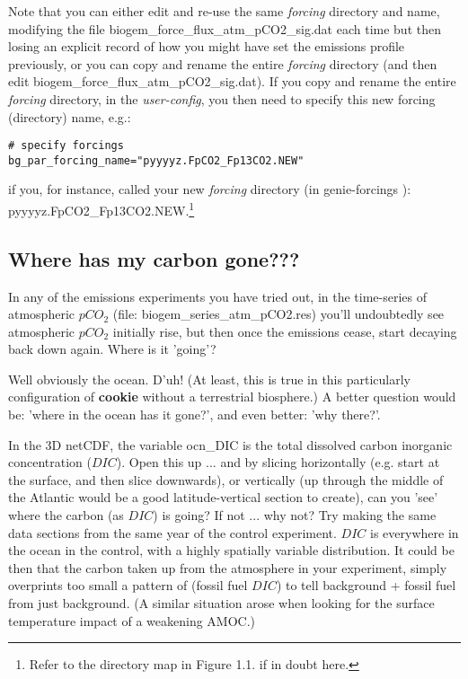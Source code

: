 Note that you can either edit and re-use the same \textit{forcing} directory and name, modifying the file \textsf{\footnotesize biogem\_force\_flux\_atm\_pCO2\_sig.dat} each time but then losing an explicit record of how you might have set the emissions profile previously, or you can copy and rename the entire \textit{forcing} directory (and then edit \textsf{\footnotesize biogem\_force\_flux\_atm\_pCO2\_sig.dat}). If you copy and rename the entire \textit{forcing} directory, in the \textit{user-config}, you then need to specify this new forcing (directory) name, e.g.:
\vspace{-2pt}\small\begin{verbatim}
# specify forcings
bg_par_forcing_name="pyyyyz.FpCO2_Fp13CO2.NEW"
\end{verbatim}\normalsize\vspace{-2pt}
if you, for instance, called your new \textit{forcing} directory (in \textsf{\footnotesize genie-forcings }): \textsf{\footnotesize pyyyyz.FpCO2\_Fp13CO2.NEW}.\footnote{Refer to the directory map in Figure 1.1. if in doubt here.}

\vspace{20pt}

\newpage

\subsection{Where has my carbon gone???}

In any of the emissions experiments you have tried out, in the time-series of atmospheric \(pCO_{2}\) (file: \textsf{\footnotesize biogem\_series\_atm\_pCO2.res}) you'll undoubtedly see atmospheric \(pCO_{2}\) initially rise, but then once the emissions cease, start decaying back down again. Where is it 'going'?

Well obviously the ocean. D'uh! (At least, this is true in this particularly configuration of \textbf{cookie} without a terrestrial biosphere.) A better question would be: 'where in the ocean has it gone?', and even better: 'why there?'.

In the 3D netCDF, the variable \textsf{\footnotesize ocn\_DIC} is the total dissolved carbon inorganic concentration (\(DIC\)). Open this up ... and by slicing horizontally (e.g. start at the surface, and then slice downwards), or vertically (up through the middle of the Atlantic would be a good latitude-vertical section to create), can you 'see' where the carbon (as \(DIC\)) is going? If not ... why not? Try making the same data sections from the same year of the control experiment. \(DIC\) is everywhere in the ocean in the control, with a highly spatially variable distribution. It could be then that the carbon taken up from the atmosphere in your experiment, simply overprints too small a pattern of (fossil fuel \(DIC\)) to tell background + fossil fuel from just background. (A similar situation arose when looking for the surface temperature impact of a weakening AMOC.)


